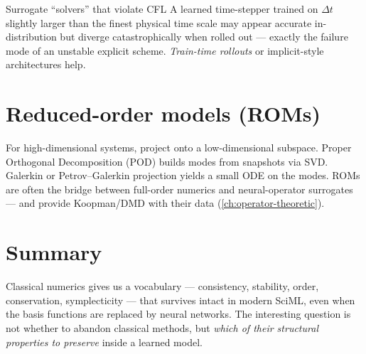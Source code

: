 \begin{pitfall}{Surrogate ``solvers'' that violate CFL}
A learned time-stepper trained on $\Delta t$ slightly larger than the
finest physical time scale may appear accurate in-distribution but
diverge catastrophically when rolled out --- exactly the failure mode
of an unstable explicit scheme. \emph{Train-time rollouts} or
implicit-style architectures help.
\end{pitfall}

\section{Reduced-order models (ROMs)}
For high-dimensional systems, project onto a low-dimensional subspace.
Proper Orthogonal Decomposition (POD) builds modes from snapshots via
SVD. Galerkin or Petrov--Galerkin projection yields a small ODE on the
modes. ROMs are often the bridge between full-order numerics and
neural-operator surrogates --- and provide Koopman/DMD with their data
(\cref{ch:operator-theoretic}).

\section{Summary}
Classical numerics gives us a vocabulary --- consistency, stability,
order, conservation, symplecticity --- that survives intact in modern
SciML, even when the basis functions are replaced by neural
networks. The interesting question is not whether to abandon classical
methods, but \emph{which of their structural properties to preserve}
inside a learned model.

